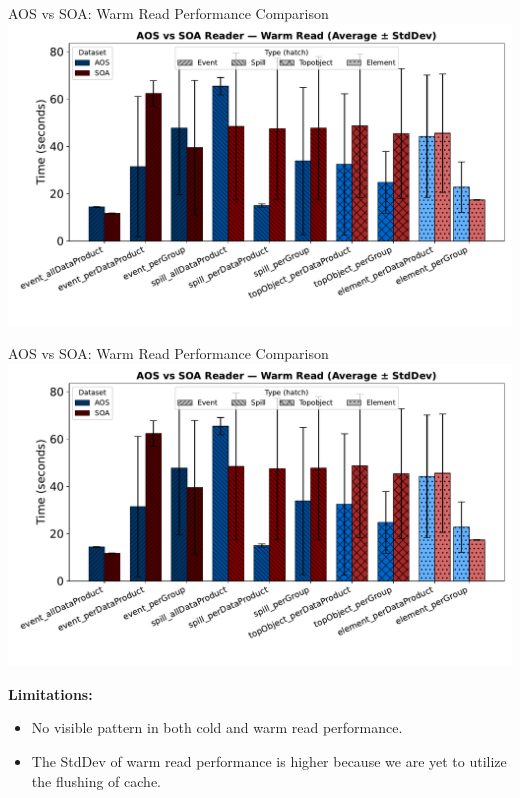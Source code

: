 \documentclass[aspectratio=169]{beamer}
\begin{document}
\begin{frame}{AOS vs SOA: Warm Read Performance Comparison}
\centering
\includegraphics[width=0.8\linewidth]{../experiments/Seaborn/AOS_SOA_Reader_Warm_grouped.pdf}
\end{frame}

\begin{frame}{AOS vs SOA: Warm Read Performance Comparison}
  \centering
  \includegraphics[width=0.5\linewidth]{../experiments/Seaborn/AOS_SOA_Reader_Warm_grouped.pdf}
  
  \textbf{Limitations:}
  \begin{itemize}
  \item No visible pattern in both cold and warm read performance.
  \item The StdDev of warm read performance is higher because we are yet to utilize the flushing of cache.
  \end{itemize}
  \end{frame}
\end{document}
